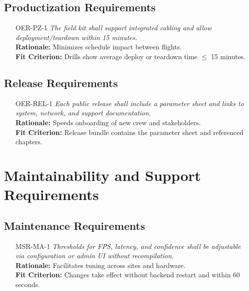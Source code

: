 \documentclass[12pt]{article}
\begin{document}
\subsection{Productization Requirements}
\begin{itemize}[leftmargin=*]
  \item[OER-PZ-1] \emph{The field kit shall support integrated cabling and allow
          deployment/teardown within 15 minutes.}\\ \textbf{Rationale:} Minimizes
        schedule impact between flights.\\ \textbf{Fit Criterion:} Drills show average
        deploy or teardown time $\leq$ 15 minutes.
\end{itemize}

\subsection{Release Requirements}
\begin{itemize}[leftmargin=*]
  \item[OER-REL-1] \emph{Each public release shall include a parameter sheet and links
          to system, network, and support documentation.}\\ \textbf{Rationale:} Speeds
        onboarding of new crew and stakeholders.\\ \textbf{Fit Criterion:} Release
        bundle contains the parameter sheet and referenced chapters.
\end{itemize}

\section{Maintainability and Support Requirements}
\subsection{Maintenance Requirements}
\begin{itemize}[leftmargin=*]
  \item[MSR-MA-1] \emph{Thresholds for FPS, latency, and confidence shall be adjustable
          via configuration or admin UI without recompilation.}\\ \textbf{Rationale:}
        Facilitates tuning across sites and hardware.\\ \textbf{Fit Criterion:} Changes
        take effect without backend restart and within 60 seconds.
\end{itemize}
\end{document}
